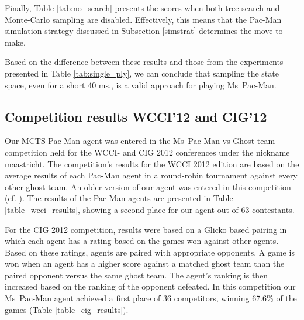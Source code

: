 \documentclass[journal]{IEEEtran}
\begin{document}
Finally, Table \ref{tab:no_search} presents the scores when both tree search and Monte-Carlo sampling are disabled. Effectively, this means that the Pac-Man simulation strategy discussed in Subsection \ref{simstrat} determines the move to make. 

Based on the difference between these results and those from the experiments presented in Table \ref{tab:single_ply}, we can conclude that sampling the state space, even for a short 40 ms., is a valid approach for playing Ms~Pac-Man. 

\subsection{Competition results WCCI'12 and CIG'12}
Our {\sc MCTS Pac-Man} agent was entered in the Ms~Pac-Man vs Ghost team competition \cite{mspacmanvsghost} held for the WCCI- and CIG 2012 conferences under the nickname {\sc maastricht}. The competition's results for the WCCI 2012 edition are based on the average results of each Pac-Man agent in a round-robin tournament against every other ghost team. An older version of our agent was entered in this competition (cf. \cite{enhancementspacmancig12}). The results of the Pac-Man agents are presented in Table \ref{table_wcci_results}, showing a second place for our agent out of 63 contestants. 

For the CIG 2012 competition, results were based on a Glicko based pairing in which each agent has a rating based on the games won against other agents. Based on these ratings, agents are paired with appropriate opponents. A game is won when an agent has a higher score against a matched ghost team than the paired opponent versus the same ghost team. The agent's ranking is then increased based on the ranking of the opponent defeated. In this competition our Ms~Pac-Man agent achieved a first place of 36 competitors, winning 67.6\% of the games (Table \ref{table_cig_results}). 
\end{document}
